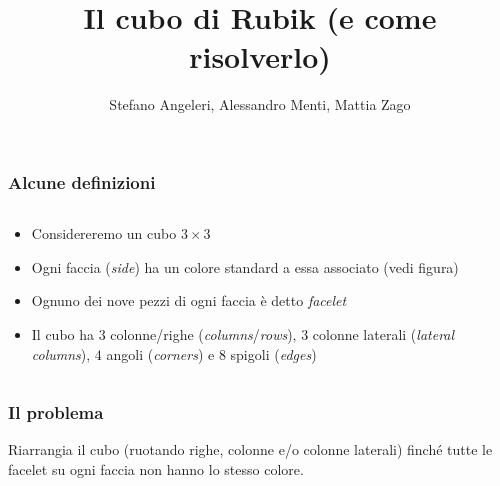 \documentclass{beamer}
\title{Il cubo di Rubik (e come risolverlo)}
\author[S.~Angeleri, A.~Menti, M.~Zago]{Stefano Angeleri, Alessandro Menti,
Mattia Zago}
\date{}
\begin{document}
\begin{frame}
\maketitle
\end{frame}

\begin{frame}
\frametitle{Alcune definizioni}
\begin{columns}
\begin{column}{.45\textwidth}
\begin{itemize}
\item<1,2,3,4,5,6> Considereremo un cubo $3\times 3$
\item Ogni faccia (\emph{side}) ha un colore standard a essa associato (vedi
figura)
\item Ognuno dei nove pezzi di ogni faccia è detto \emph{facelet}
\item Il cubo ha $3$ colonne/righe (\emph{columns}/\emph{rows}), $3$ colonne
laterali (\emph{lateral columns}), $4$ angoli (\emph{corners}) e $8$ spigoli
(\emph{edges})
\end{itemize}
\end{column}
\begin{column}{.45\textwidth}
\centering
{}
\pause
{}
\pause
{}
\pause
{}
\pause
{}
\pause
{}
\end{column}
\end{columns}
\end{frame}

\begin{frame}
\frametitle{Il problema}
Riarrangia il cubo (ruotando righe, colonne e/o colonne laterali) finché tutte
le facelet su ogni faccia non hanno lo stesso colore.
\end{frame}
\end{document}
